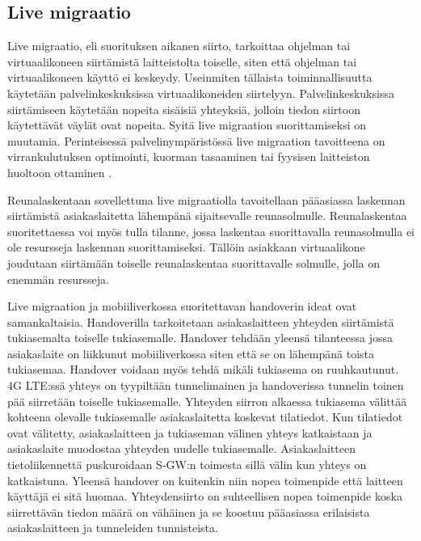 \subsection{Live migraatio}
Live migraatio, eli suorituksen aikanen siirto, tarkoittaa ohjelman tai virtuaalikoneen siirtämistä laitteistolta toiselle, siten että ohjelman tai virtuaalikoneen käyttö ei keskeydy. 
Useinmiten tällaista toiminnallisuutta käytetään palvelinkeskuksissa virtuaalikoneiden
siirtelyyn. Palvelinkeskuksissa siirtämiseen käytetään nopeita sisäisiä yhteyksiä,
jolloin tiedon siirtoon käytettävät väylät ovat nopeita. Syitä live migraation
suorittamiseksi on muutamia. Perinteisessä palvelinympäristössä live migraation
tavoitteena on virrankulutuksen optimointi, kuorman tasaaminen tai fyysisen
laitteiston huoltoon ottaminen \cite{soni2013comparative}. 

Reunalaskentaan sovellettuna live migraatiolla tavoitellaan pääasiassa laskennan 
siirtämistä asiakaslaitetta lähempänä sijaitsevalle reunasolmulle.
Reunalaskentaa suoritettaessa voi myös tulla tilanne, jossa laskentaa suorittavalla reunasolmulla ei ole resursseja laskennan suorittamiseksi. Tällöin asiakkaan virtuaalikone joudutaan siirtämään toiselle reunalaskentaa suorittavalle solmulle, jolla on enemmän resursseja.  

Live migraation ja mobiiliverkossa suoritettavan handoverin ideat ovat samankaltaisia.
Handoverilla tarkoitetaan asiakaslaitteen yhteyden siirtämistä tukiasemalta toiselle tukiasemalle. 
Handover tehdään yleensä tilanteessa jossa asiakaslaite on liikkunut mobiiliverkossa siten että se on lähempänä toista tukiasemaa. Handover voidaan myös tehdä mikäli tukiasema on ruuhkautunut. \cite{lähde}
4G LTE:ssä yhteys on tyypiltään tunnelimainen ja handoverissa tunnelin toinen pää siirretään toiselle tukiasemalle.
Yhteyden siirron alkaessa tukiasema välittää kohteena olevalle tukiasemalle asiakaslaitetta koskevat tilatiedot. Kun tilatiedot ovat välitetty, asiakaslaitteen ja tukiaseman välinen yhteys katkaistaan ja asiakaslaite muodostaa yhteyden uudelle tukiasemalle. Asiakaslaitteen tietoliikennettä puskuroidaan S-GW:n toimesta sillä välin kun yhteys on katkaistuna. Yleensä handover on kuitenkin niin nopea toimenpide että laitteen käyttäjä ei sitä huomaa.
Yhteydensiirto on suhteellisen nopea toimenpide koska siirrettävän tiedon määrä on vähäinen ja se koostuu pääasiassa erilaisista asiakaslaitteen ja tunneleiden tunnisteista.

